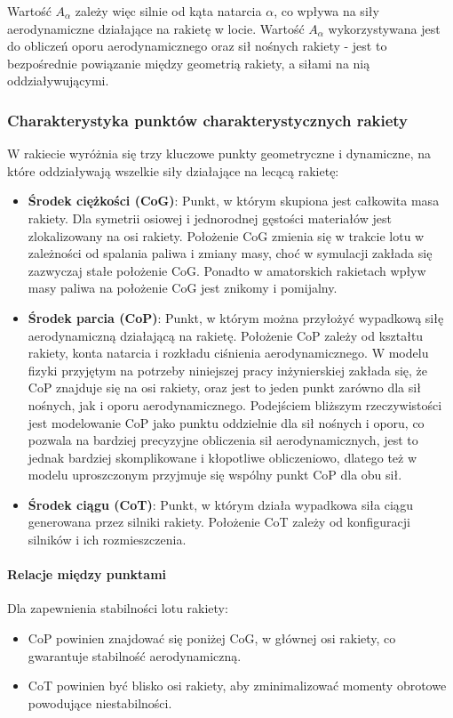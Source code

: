 Wartość $A_\alpha$ zależy więc silnie od kąta natarcia $\alpha$, co wpływa
na siły aerodynamiczne działające na rakietę w locie. Wartość $A_\alpha$
wykorzystywana jest do obliczeń oporu aerodynamicznego oraz sił nośnych
rakiety - jest to bezpośrednie powiązanie między geometrią rakiety, a siłami
na nią oddziaływującymi.


\subsubsection{Charakterystyka punktów charakterystycznych rakiety}
W rakiecie wyróżnia się trzy kluczowe punkty geometryczne i dynamiczne, na
które oddziaływają wszelkie siły działające na lecącą rakietę:

\begin{itemize}
    \item \textbf{Środek ciężkości (CoG)}: Punkt, w którym skupiona jest
    całkowita masa rakiety. Dla symetrii osiowej i jednorodnej gęstości
    materiałów jest zlokalizowany na osi rakiety. Położenie CoG zmienia się
    w trakcie lotu w zależności od spalania paliwa i zmiany masy, choć w
    symulacji zakłada się zazwyczaj stałe położenie CoG. Ponadto w
    amatorskich rakietach wpływ masy paliwa na położenie CoG jest znikomy i
    pomijalny.

    \item \textbf{Środek parcia (CoP)}: Punkt, w którym można przyłożyć
    wypadkową siłę aerodynamiczną działającą na rakietę. Położenie CoP
    zależy od kształtu rakiety, konta natarcia i rozkładu ciśnienia
    aerodynamicznego. W modelu fizyki przyjętym na potrzeby niniejszej pracy
    inżynierskiej zakłada się, że CoP znajduje się na osi rakiety, oraz jest
    to jeden punkt zarówno dla sił nośnych, jak i oporu aerodynamicznego.
    Podejściem bliższym rzeczywistości jest modelowanie CoP jako punktu
    oddzielnie dla sił nośnych i oporu, co pozwala na bardziej precyzyjne
    obliczenia sił aerodynamicznych, jest to jednak bardziej skomplikowane i
    kłopotliwe obliczeniowo, dlatego też w modelu uproszczonym przyjmuje się
    wspólny punkt CoP dla obu sił.

    \item \textbf{Środek ciągu (CoT)}: Punkt, w którym działa wypadkowa siła
    ciągu generowana przez silniki rakiety. Położenie CoT zależy od
    konfiguracji silników i ich rozmieszczenia.
\end{itemize}

\paragraph{Relacje między punktami}
Dla zapewnienia stabilności lotu rakiety:
\begin{itemize}
    \item CoP powinien znajdować się poniżej CoG, w głównej osi rakiety, co
    gwarantuje stabilność aerodynamiczną.
    \item CoT powinien być blisko osi rakiety, aby zminimalizować momenty obrotowe powodujące niestabilności.
\end{itemize}


